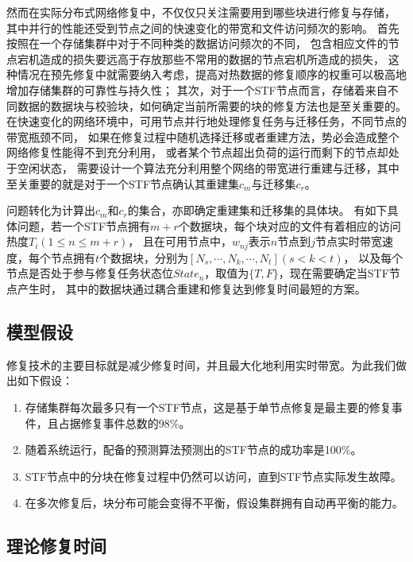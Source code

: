 然而在实际分布式网络修复中，不仅仅只关注需要用到哪些块进行修复与存储，
其中并行的性能还受到节点之间的快速变化的带宽和文件访问频次的影响。
首先按照在一个存储集群中对于不同种类的数据访问频次的不同，
包含相应文件的节点宕机造成的损失要远高于存放那些不常用的数据的节点宕机所造成的损失，
这种情况在预先修复中就需要纳入考虑，提高对热数据的修复顺序的权重可以极高地增加存储集群的可靠性与持久性；
其次，对于一个STF节点而言，存储着来自不同数据的数据块与校验块，如何确定当前所需要的块的修复方法也是至关重要的。
在快速变化的网络环境中，可用节点并行地处理修复任务与迁移任务，不同节点的带宽瓶颈不同，
如果在修复过程中随机选择迁移或者重建方法，势必会造成整个网络修复性能得不到充分利用，
或者某个节点超出负荷的运行而剩下的节点却处于空闲状态，
需要设计一个算法充分利用整个网络的带宽进行重建与迁移，其中至关重要的就是对于一个STF节点确认其重建集$c_m$与迁移集$c_r$。

问题转化为计算出$c_m$和$c_r$的集合，亦即确定重建集和迁移集的具体块。
有如下具体问题，若一个STF节点拥有$m+r$个数据块，每个块对应的文件有着相应的访问热度$T_i(1\leqslant n \leqslant m+r)$，
且在可用节点中，$w_{nj}$表示$n$节点到$j$节点实时带宽速度，每个节点拥有$t$个数据块，分别为$[N_s,\cdots,N_k,\cdots,N_t](s<k<t)$，
以及每个节点是否处于参与修复任务状态位$State_n$，取值为$\{T,F\}$，现在需要确定当STF节点产生时，
其中的数据块通过耦合重建和修复达到修复时间最短的方案。

\subsection{模型假设}
修复技术的主要目标就是减少修复时间，并且最大化地利用实时带宽。为此我们做出如下假设：

\begin{enumerate}
	\item 存储集群每次最多只有一个STF节点，这是基于单节点修复是最主要的修复事件，且占据修复事件总数的98\%\cite{rashmi2013solution}。
	\item 随着系统运行，配备的预测算法预测出的STF节点的成功率是100\%。
	\item STF节点中的分块在修复过程中仍然可以访问，直到STF节点实际发生故障。
	\item 在多次修复后，块分布可能会变得不平衡，假设集群拥有自动再平衡的能力。
\end{enumerate}

\subsection{理论修复时间}
\label{subsection3.1}

